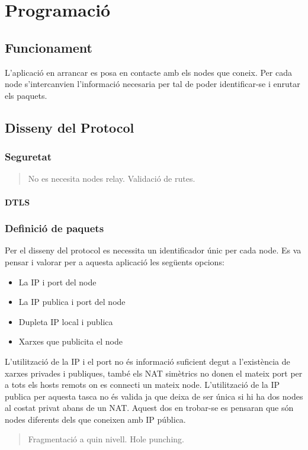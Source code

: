 \chapter{Programació}
\section{Funcionament}
L'aplicació en arrancar es posa en contacte amb els nodes que coneix. Per cada node s'intercanvien l'informació necesaria per tal de poder identificar-se i enrutar els paquets.
\section{Disseny del Protocol}
\subsection{Seguretat}

\begin{quote}
No es necesita nodes relay.
Validació de rutes.
\end{quote}
\subsubsection{DTLS}

\subsection{Definició de paquets}
Per el disseny del protocol es necessita un identificador únic per cada node. Es va pensar i valorar per a aquesta aplicació les següents opcions:
\begin{itemize}
\item La IP i port del node
\item La IP publica i port del node
\item Dupleta IP local i publica
\item Xarxes que publicita el node
\end{itemize}
L'utilització de la IP i el port no és informació suficient degut a l'existència de xarxes privades i publiques, també els NAT simètrics no donen el mateix port per a tots els hosts remots on es connecti un mateix node.
L'utilització de la IP publica per aquesta tasca no és valida ja que deixa de ser única si hi ha dos nodes al costat privat abans de un NAT. Aquest dos en trobar-se es pensaran que són nodes diferents dels que coneixen amb IP pública.

\begin{quote}
Fragmentació a quin nivell.
Hole punching.
\end{quote}

